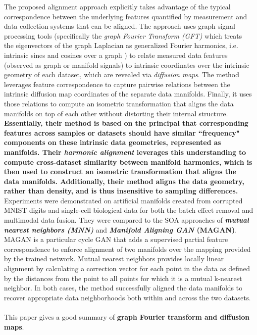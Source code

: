 \documentclass[]{article}
\begin{document}
		The proposed alignment approach explicitly takes advantage of the typical correspondence  between the underlying features quantified by measurement and data collection systems that can be aligned.  The approach uses graph signal processing tools (specifically the \textit{graph Fourier Transform (GFT)} which treats the eigenvectors of the graph Laplacian as generalized Fourier harmonics, i.e. intrinsic sines and cosines over a graph ) to relate measured data features (observed as graph or manifold signals) to intrinsic coordinates over the intrinsic geometry of each dataset, which are revealed via \textit{diffusion maps}.  The method leverages feature correspondence to capture pairwise relations between the intrinsic diffusion map coordinates of the separate data manifolds.  Finally, it uses those relations to compute an isometric transformation that aligns the data manifolds on top of each other without distorting their internal structure.  \textbf{Essentially, their method is based on the principal that corresponding features across samples or datasets should have similar ``frequency" components on these intrinsic data geometries, represented as manifolds.  Their \textit{harmonic alignment} leverages this understanding to compute cross-dataset similarity between manifold harmonics, which is then used to construct an isometric transformation that aligns the data manifolds.  Additionally, their method aligns the data geometry, rather than density, and is thus insensitive to sampling differences.}  Experiments were demonstrated on artificial manifolds created from corrupted MNIST digits and single-cell biological data for both the batch effect removal and multimodal data fusion. They were compared to the SOA approaches of \textbf{\textit{mutual nearest neighbors (MNN)}} and \textbf{\textit{Manifold Aligning GAN} (MAGAN)}.  MAGAN is a particular cycle GAN that adds a supervised partial feature correspondence to enforce alignment of two manifolds over the mapping provided by the trained network.  Mutual nearest neighbors provides locally linear alignment by calculating a correction vector for each point in the data as defined by the distances from the point to all points for which it is a mutual k-nearest neighbor. In both cases, the method successfully aligned the data manifolds to recover appropriate data neighborhoods both within and across the two datasets. 
		\\ \\
		This paper gives a good summary of \textbf{graph Fourier transform and diffusion maps}. \\
		
\end{document}
